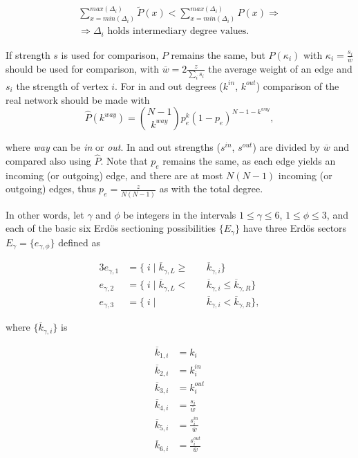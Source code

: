 \documentclass[%
	aip,
	jmp,%
	amsmath,amssymb,
	reprint,%
]{revtex4-1}
\begin{document}
\begin{equation}\label{criterio2}
	\begin{split}
	\sum_{x=min(\Delta_i)}^{max(\Delta_i)} \widetilde{P}(x) < \sum_{x=min(\Delta_i)}^{max(\Delta_i)} P(x) \Rightarrow \\
	\Rightarrow \Delta_i \text{ holds intermediary degree values.}
	\end{split}
\end{equation}

If strength $s$ is used for comparison, $P$ remains the same, but $P(\kappa_i)$ with $\kappa_i=\frac{s_i}{\overline{w}}$ should be used for comparison, with $\overline{w}=2\frac{z}{\sum_is_i}$ the average weight of an edge and $s_i$ the strength of vertex $i$. For in and out degrees ($k^{in}$, $k^{out}$) comparison of the real network should be made with
\begin{equation}
	\hat{P}(k^{way})=\binom{N-1}{k^{way}}p_e^k(1-p_e)^{N-1-k^{way}},
\end{equation}

\noindent where \emph{way} can be \emph{in} or \emph{out}. In and out strengths ($s^{in}$, $s^{out}$) are divided by $\overline{w}$ and compared also using $\hat{P}$. Note that $p_e$ remains the same, as each edge yields an incoming (or outgoing) edge, and there are at most $N(N-1)$ incoming (or outgoing) edges, thus $p_e=\frac{z}{N(N-1)}$ as with the total degree.

In other words, let $\gamma$ and $\phi$ be integers in the intervals $1 \leq \gamma \leq 6$, $1 \leq \phi \leq 3$, and each of the basic six Erd\"os sectioning possibilities $\{E_{\gamma}\}$ have three Erd\"os sectors $E_{\gamma}= \{e_{\gamma, \phi} \}$ defined as

\begin{alignat}{3}\label{eq:part}
	e_{\gamma,1}&=\{\;i\;|\;\overline{k}_{\gamma,L}\geq&&\overline{k}_{\gamma,i}\} \nonumber \\
	e_{\gamma,2}&=\{\;i\;|\;\overline{k}_{\gamma,L}<\;&&\overline{k}_{\gamma,i}\leq\overline{k}_{\gamma,R}\} \\ 
	e_{\gamma,3}&=\{\;i\;|\;&&\overline{k}_{\gamma,i}<\overline{k}_{\gamma,R}\} \nonumber,
\end{alignat}

\noindent where $\{\overline{k}_{\gamma,i}\}$ is

\begin{equation}
	\begin{split}
		\overline{k}_{1,i}&=k_i \\
		\overline{k}_{2,i}&=k_i^{in} \\
		\overline{k}_{3,i}&=k_i^{out} \\
		\overline{k}_{4,i}&=\frac{s_i}{\overline{w}} \\
		\overline{k}_{5,i}&=\frac{s_i^{in}}{\overline{w}} \\
		\overline{k}_{6,i}&=\frac{s_i^{out}}{\overline{w}}
	\end{split}
\end{equation}
\end{document}
